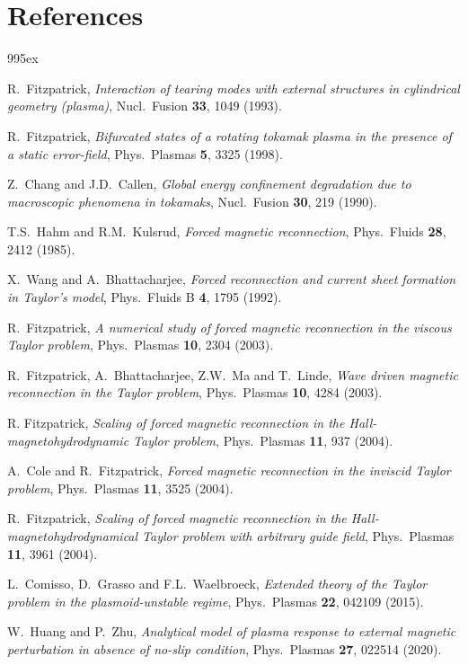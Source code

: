 \documentclass[12pt,prb,aps]{revtex4-1}
\begin{document}
\section*{References}
\begin{thebibliography}{99}\baselineskip 5ex

 R.~Fitzpatrick, {\em Interaction of tearing modes with external structures in cylindrical geometry (plasma)}, Nucl.\ Fusion {\bf 33}, 1049 (1993).

 R.~Fitzpatrick,  {\em Bifurcated states of a rotating tokamak plasma in the presence of a static error-field}, Phys.\ Plasmas {\bf 5}, 3325 (1998).

  Z.~Chang and J.D.~Callen, {\em Global energy confinement degradation due to macroscopic phenomena in tokamaks}, Nucl.\ Fusion {\bf 30}, 219 (1990).

 T.S.~Hahm and R.M.~Kulsrud, {\em Forced magnetic reconnection}, Phys.\ Fluids {\bf 28}, 2412 (1985).

 X.~Wang and A.~Bhattacharjee, {\em Forced reconnection and current sheet formation in Taylor’s model}, Phys.\ Fluids B {\bf 4}, 1795 (1992).

 R.~Fitzpatrick, {\em A numerical study of forced magnetic reconnection in the viscous Taylor problem}, Phys.\ Plasmas {\bf 10}, 2304 (2003).

 R.~Fitzpatrick, A.~Bhattacharjee, Z.W.~Ma and T.~Linde,  {\em Wave driven magnetic reconnection in the Taylor problem}, Phys.\ Plasmas {\bf 10}, 4284 (2003).

 R. Fitzpatrick,  {\em Scaling of forced magnetic reconnection in the Hall-magnetohydrodynamic Taylor problem}, Phys.\ Plasmas {\bf 11}, 937 (2004).

 A.~Cole and R.~Fitzpatrick, {\em Forced magnetic reconnection in the inviscid Taylor problem}, Phys.\ Plasmas {\bf 11}, 3525 (2004).

 R.~Fitzpatrick,  {\em Scaling of forced magnetic reconnection in the Hall-magnetohydrodynamical Taylor problem with arbitrary guide field}, Phys.\ Plasmas {\bf 11}, 3961 (2004).

 L.~Comisso, D.~Grasso and F.L.~Waelbroeck,  {\em Extended theory of the Taylor problem in the plasmoid-unstable regime}, Phys.\ Plasmas {\bf 22}, 042109 (2015).

 W.~Huang and P.~Zhu, {\em Analytical model of plasma response to external magnetic perturbation in absence of no-slip condition}, Phys.\  Plasmas {\bf 27}, 022514 (2020).


\end{thebibliography}
\end{document}
